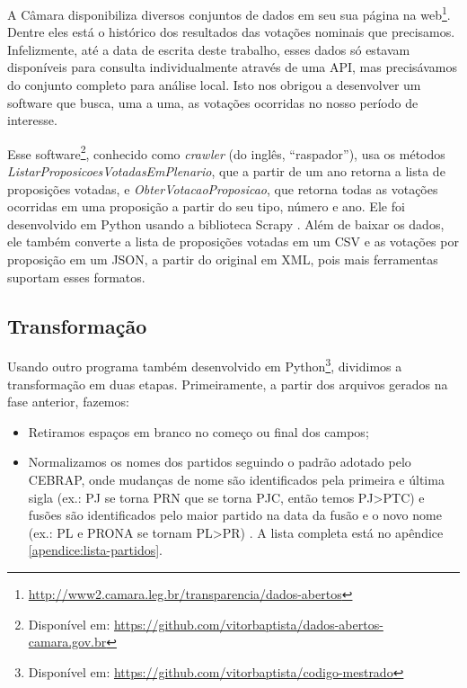 \documentclass[a4paper,titlepage]{ppgi}\usepackage[]{graphicx}\usepackage[]{color}
\begin{document}
A Câmara disponibiliza diversos conjuntos de dados em seu sua página na
web\footnote{\url{http://www2.camara.leg.br/transparencia/dados-abertos}}.
Dentre eles está o histórico dos resultados das votações nominais que
precisamos. Infelizmente, até a data de escrita deste trabalho, esses dados só
estavam disponíveis para consulta individualmente através de uma \gls{API}, mas
precisávamos do conjunto completo para análise local.  Isto nos obrigou a
desenvolver um software que busca, uma a uma, as votações ocorridas no nosso
período de interesse.

Esse software\footnote{Disponível em:
\url{https://github.com/vitorbaptista/dados-abertos-camara.gov.br}}, conhecido
como \emph{crawler} (do inglês, ``raspador''), usa os métodos
\emph{ListarProposicoesVotadasEmPlenario}, que a partir de um ano retorna a
lista de proposições votadas, e \emph{ObterVotacaoProposicao}, que retorna
todas as votações ocorridas em uma proposição a partir do seu tipo, número e
ano. Ele foi desenvolvido em Python usando a biblioteca Scrapy
\cite{Python276,Scrapy}. Além de baixar os dados, ele também converte a lista
de proposições votadas em um \gls{CSV} e as votações por proposição em um
\gls{JSON}, a partir do original em \gls{XML}, pois mais ferramentas suportam
esses formatos.

\subsection{Transformação}
\label{sec:miolo:transformacao}

Usando outro programa também desenvolvido em Python\footnote{Disponível em:
\url{https://github.com/vitorbaptista/codigo-mestrado}}, dividimos a
transformação em duas etapas. Primeiramente, a partir dos arquivos gerados na
fase anterior, fazemos:

\begin{itemize}
  \item Retiramos espaços em branco no começo ou final dos campos;
  \item Normalizamos os nomes dos partidos seguindo o padrão adotado pelo
\gls{CEBRAP}, onde mudanças de nome são identificados pela primeira e última
sigla (ex.: PJ se torna PRN que se torna PJC, então temos PJ>PTC) e fusões são
identificados pelo maior partido na data da fusão e o novo nome (ex.: PL e
PRONA se tornam PL>PR) \cite{Freitas2008}. A lista completa está no apêndice
\ref{apendice:lista-partidos}.
\end{itemize}
\end{document}
